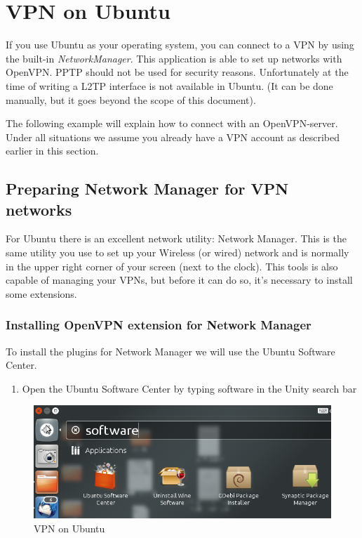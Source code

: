 \section{VPN on Ubuntu}

If you use Ubuntu as your operating system, you can connect to a VPN by
using the built-in \emph{NetworkManager}. This application is able to
set up networks with OpenVPN. PPTP should not be used for security
reasons. Unfortunately at the time of writing a L2TP interface is not
available in Ubuntu. (It can be done manually, but it goes beyond the
scope of this document).

The following example will explain how to connect with an
OpenVPN-server. Under all situations we assume you already have a VPN
account as described earlier in this section.

\subsection{Preparing Network Manager for VPN networks}

For Ubuntu there is an excellent network utility: Network Manager. This
is the same utility you use to set up your Wireless (or wired) network
and is normally in the upper right corner of your screen (next to the
clock). This tools is also capable of managing your VPNs, but before it
can do so, it's necessary to install some extensions.

\subsubsection{Installing OpenVPN extension for Network Manager}

To install the plugins for Network Manager we will use the Ubuntu
Software Center.

\begin{enumerate}[1.]
\item
  Open the Ubuntu Software Center by typing software in the Unity search
  bar
\end{enumerate}
\begin{figure}[htbp]
\centering
\includegraphics{vpn_ubuntu_001.png}
\caption{VPN on Ubuntu}
\end{figure}

